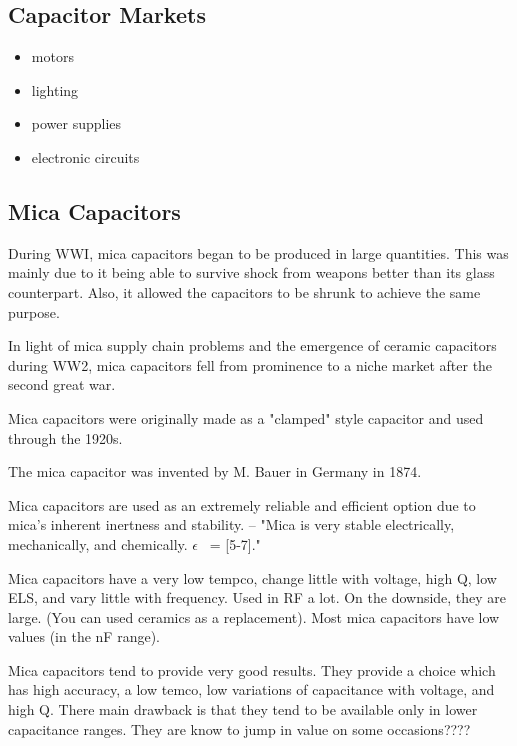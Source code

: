 \subsection{Capacitor Markets}
\begin{itemize}
    \item motors
    \item lighting
    \item power supplies
    \item electronic circuits
\end{itemize}
\cite{capRev}

\subsection{Mica Capacitors}
During WWI, mica capacitors began to be produced in large quantities. This was mainly due to it being able to survive shock from weapons better than its glass counterpart. Also, it allowed the capacitors to be shrunk to achieve the same purpose. \cite[f.~37-41]{dumInv}

In light of mica supply chain problems and the emergence of ceramic capacitors during WW2, mica capacitors fell from prominence to a niche market after the second great war.\cite[Ch 3, Sec II]{cerMaterials}

Mica capacitors were originally made as a "clamped" style capacitor and used through the 1920s\cite{wiki_mica}. 

The mica capacitor was invented by M. Bauer in Germany in 1874. 

Mica capacitors are used as an extremely reliable and efficient option due to mica's inherent inertness and stability. \cite{tedds_mica}    
--
"Mica is very stable electrically, mechanically, and chemically. $\epsilon$ ~= [5-7].\cite{uiowa_mica}"

Mica capacitors have a very low tempco, change little with voltage, high Q, low ELS, and vary little with frequency. Used in RF a lot. On the downside, they are large. (You can used ceramics as a replacement). Most mica capacitors have low values (in the nF range).\cite{uiowa_mica}

\nocite{hh_cap_table}
\nocite{capGuide_mica}

Mica capacitors tend to provide very good results. They provide a choice which has high accuracy, a low temco, low variations of capacitance with voltage, and high Q. There main drawback is that they tend to be available only in lower capacitance ranges. They are know to jump in value on some occasions???? 
\cite{radio_mica}

